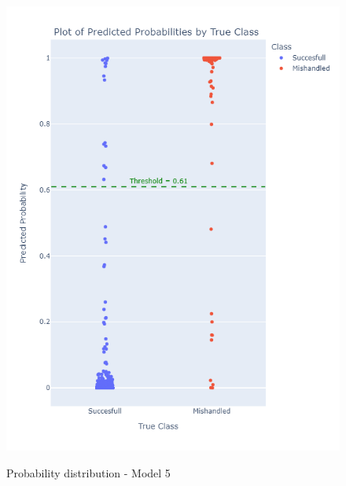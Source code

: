 \documentclass[12pt]{article}
\begin{document}
\begin{figure}
\begin{minipage}[c]{0.4\linewidth}
    \includegraphics[width=1\textwidth]{Probability_distribution_Model 5.png}\\
    \caption{Probability distribution - Model 5}
\end{minipage}
\hfill
\begin{minipage}[c]{0.4\linewidth}

\end{minipage}
\end{figure}
\end{document}
